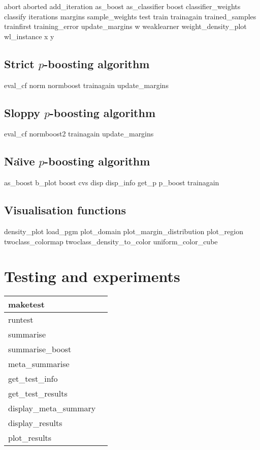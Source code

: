 abort
aborted
add\_iteration
as\_boost
as\_classifier
boost
classifier\_weights
classify
iterations
margins
sample\_weights
test
train
trainagain
trained\_samples
trainfirst
training\_error
update\_margins
w
weaklearner
weight\_density\_plot
wl\_instance
x
y

\subsection{Strict $p$-boosting algorithm}

eval\_cf
norm
normboost
trainagain
update\_margins

\subsection{Sloppy $p$-boosting algorithm}

eval\_cf
normboost2
trainagain
update\_margins

\subsection{Na\"{\i}ve $p$-boosting algorithm}

as\_boost
b\_plot
boost
cvs
disp
disp\_info
get\_p
p\_boost
trainagain


\subsection{Visualisation functions}

density\_plot
load\_pgm
plot\_domain
plot\_margin\_distribution
plot\_region
twoclass\_colormap
twoclass\_density\_to\_color
uniform\_color\_cube


\section{Testing and experiments}

\begin{tabular}{ll}
\hline
maketest		& \\
\hline
runtest			& \\
\hline
summarise		& \\
summarise\_boost	& \\
meta\_summarise		& \\
\hline
get\_test\_info		& \\
get\_test\_results	& \\
\hline
display\_meta\_summary	& \\
display\_results	& \\
plot\_results		& \\
\hline
\end{tabular}
